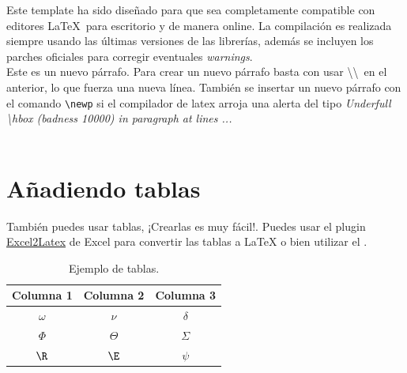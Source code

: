 
	Este template ha sido diseñado para que sea completamente compatible con editores \LaTeX\ para escritorio y de manera online. La compilación es realizada siempre usando las últimas versiones de las librerías, además se incluyen los parches oficiales para corregir eventuales \textit{warnings}. \\

	Este es un nuevo párrafo. Para crear un nuevo párrafo basta con usar \textbackslash\textbackslash\ en el anterior, lo que fuerza una nueva línea. También se insertar un nuevo párrafo con el comando \texttt{\textbackslash newp} si el compilador de latex arroja una alerta del tipo \textit{Underfull \textbackslash hbox (badness 10000) in paragraph at lines ...} \\

	\lipsum[4] \\

	\lipsum[11]

\section{Añadiendo tablas}

También puedes usar tablas, ¡Crearlas es muy fácil!. Puedes usar el plugin \href{https://www.ctan.org/tex-archive/support/excel2latex}{Excel2Latex} \cite{excel2latex} de Excel para convertir las tablas a \LaTeX\xspace o bien utilizar el  \cite{tablesgenerator}.

\begin{table}[H] %
	\centering
	\caption{Ejemplo de tablas.}
	\begin{tabular}{ccc}
		\hline
		\textbf{Columna 1} & \textbf{Columna 2} & \textbf{Columna 3} \bigstrut\\
		\hline
		$\omega$ & $\nu$ & $\delta$ \bigstrut[t]\\
		$\Phi$ & $\Theta$ & $\varSigma$ \\
		$\R$ & $\E$ & $\psi$ \\
		\hline
	\end{tabular}
	\label{tab:tabla-1}
\end{table}

